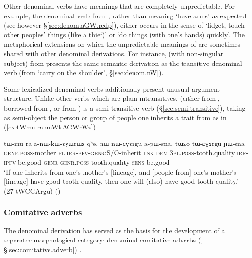 Other denominal verbs have meanings that are completely unpredictable. For example, the denominal verb  from , rather than meaning `have arms' as expected (see however §\ref{sec:denom.aGW.redp}), either occurs in the sense of `fidget, touch other peoples' things (like a thief)' or `do things (with one's hands) quickly'. The metaphorical extensions on which the unpredictable meanings of  are sometimes shared with other denominal derivations. For instance,  (with non-singular subject) from  presents the same semantic derivation as the transitive denominal verb  (from `carry on the shoulder', §\ref{sec:denom.nW}).

Some lexicalized  denominal verbs additionally present unusual argument structure. Unlike other  verbs which are plain intransitives,  (either from , borrowed from , or from ) is a semi-transitive verb (§\ref{sec:semi.transitive}), taking as semi-object the person or group of people one inherits a trait from as in (\ref{ex:tWmu.ra.anWkAGWrWz}).

\begin{exe}
\ex \label{ex:tWmu.ra.anWkAGWrWz}
\gll tɯ-mu ra a-nɯ-kɯ-ɤɣɯrɯz qʰe, nɯ nɯ-ɕɣɤrgu a-pɯ-sna, tɯʑo tɯ-ɕɣɤrgu ɲɯ-sna \\
\textsc{genr}.\textsc{poss}-mother \textsc{pl} \textsc{irr}-\textsc{pfv}-\textsc{genr}:S/O-inherit \textsc{lnk} \textsc{dem} \textsc{3pl}.\textsc{poss}-tooth.quality \textsc{irr}-\textsc{ipfv}-be.good \textsc{genr} \textsc{genr}.\textsc{poss}-tooth.quality \textsc{sens}-be.good \\
\glt `If one inherits from one's mother's [lineage], and [people from] one's mother's [lineage] have good tooth quality, then one will (also) have good tooth quality.' (27-tWCGArgu)
()
\end{exe}


 \subsubsection{Comitative adverbs}  \label{sec:denom.aGW.comitative}
The  denominal derivation has served as the basis for the development of a separatee morphological category: denominal comitative adverbs (\citealt{jacques17comitative}, §\ref{sec:comitative.adverb}) .

